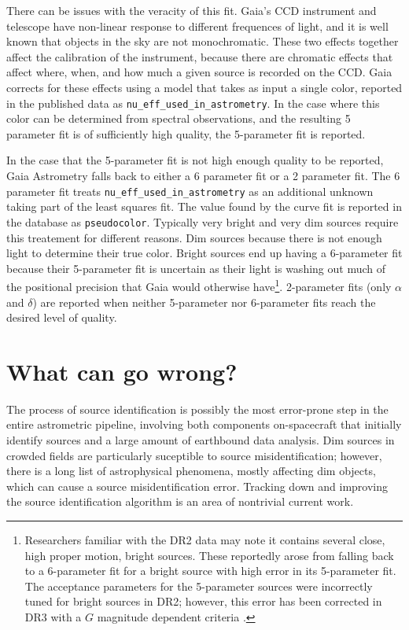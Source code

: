 \documentclass[preprint2]{aastex631}
\begin{document}
There can be issues with the veracity of this fit. Gaia's CCD instrument and telescope have non-linear response to different frequences of light, and it is well known that objects in the sky are not monochromatic. These two effects together affect the calibration of the instrument, because there are chromatic effects that affect where, when, and how much a given source is recorded on the CCD. Gaia corrects for these effects using a model that takes as input a single color, reported in the published data as \texttt{nu\_eff\_used\_in\_astrometry}. In the case where this color can be determined from spectral observations, and the resulting 5 parameter fit is of sufficiently high quality, the 5-parameter fit is reported.

In the case that the 5-parameter fit is not high enough quality to be reported, Gaia Astrometry falls back to either a 6 parameter fit or a 2 parameter fit. The 6 parameter fit treats \texttt{nu\_eff\_used\_in\_astrometry} as an additional unknown taking part of the least squares fit. The value found by the curve fit is reported in the database as \texttt{pseudocolor}. Typically very bright and very dim sources require this treatement for different reasons. Dim sources because there is not enough light to determine their true color. Bright sources end up having a 6-parameter fit because their 5-parameter fit is uncertain as their light is washing out much of the positional precision that Gaia would otherwise have\footnote{Researchers familiar with the DR2 data may note it contains several close, high proper motion, bright sources. These reportedly arose from falling back to a 6-parameter fit for a bright source with high error in its 5-parameter fit. The acceptance parameters for the 5-parameter sources were incorrectly tuned for bright sources in DR2; however, this error has been corrected in DR3 with a $G$ magnitude dependent criteria \citep{lindegrenGaia2021a}.}. 2-parameter fits (only $\alpha$ and $\delta$) are reported when neither 5-parameter nor 6-parameter fits reach the desired level of quality.

\section{What can go wrong?} \label{sec:wrong}

The process of source identification is possibly the most error-prone step in the entire astrometric pipeline, involving both components on-spacecraft that initially identify sources and a large amount of earthbound data analysis. Dim sources in crowded fields are particularly suceptible to source misidentification; however, there is a long list of astrophysical phenomena, mostly affecting dim objects, which can cause a source misidentification error. Tracking down and improving the source identification algorithm is an area of nontrivial current work.%
\end{document}
